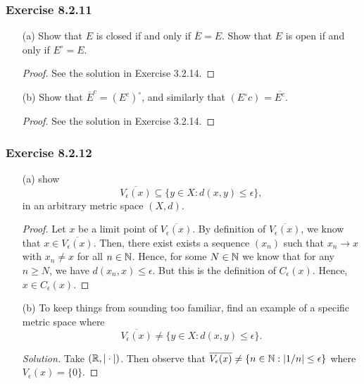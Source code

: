 \subsubsection{Exercise 8.2.11} 
\begin{enumerate}
    \item[(a)] Show that \( E  \) is closed if and only if \( \overline{E} = E  \). Show that \( E  \) is open if and only if \( E^{\circ} = E  \). 
        \begin{proof}
        See the solution in Exercise 3.2.14. 
        \end{proof}
    \item[(b)] Show that \( \overline{E}^{c} = (E^{c})^{\circ}  \), and similarly that \( (E^{\circ}c)^{} = \overline{E^{c}} \).
        \begin{proof}
        See the solution in Exercise 3.2.14.
        \end{proof}
\end{enumerate}


\subsubsection{Exercise 8.2.12}
\begin{enumerate}
    \item[(a)] show 
        \[  \overline{V_{\epsilon }(x)}  \subseteq \{ y \in X : d(x,y) \leq \epsilon  \},\]
        in an arbitrary metric space \( (X,d) \).
        \begin{proof}
            Let \( x  \) be a limit point of \( \overline{V_{\epsilon }(x)} \). By definition of \( \overline{V_{\epsilon }(x)}  \), we know that \( x \in \overline{V_{\epsilon }(x)} \). Then, there exist exists a sequence \( (x_{n})  \) such that \( x_{n} \to x  \) with \( x_{n} \neq x  \) for all \( n \in \mathbb{N}  \). Hence, for some \( N \in \mathbb{N}  \) we know that for any \( n \geq N  \), we have \( d(x_{n}, x) \leq \epsilon  \). But this is the definition of \( C_{\epsilon }(x) \). Hence, \( x \in C_{\epsilon }(x) \).
        \end{proof}
    \item[(b)] To keep things from sounding too familiar, find an example of a specific metric space where 
        \[  \overline{V_{\epsilon }(x)} \neq \{ y \in X : d(x,y) \leq \epsilon  \}.\]
        \begin{proof}[Solution]
        Take \( (\mathbb{R}, | \cdot | ) \). Then observe that \( \overline{V_{\epsilon }(x)} \neq \{ n \in \mathbb{N} : | 1 / n | \leq \epsilon \}  \) where \( V_{\epsilon }(x) =  \{ 0 \}  \).
        \end{proof}
\end{enumerate}


